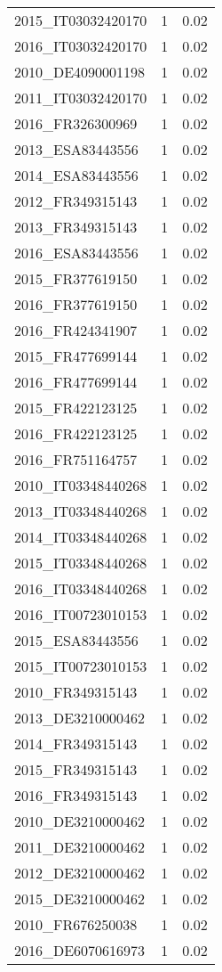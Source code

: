 \begin{table*}[htbp]
\begin{tabular}{lrr}
2015_IT03032420170 & 1 & 0.02 \\
2016_IT03032420170 & 1 & 0.02 \\
2010_DE4090001198 & 1 & 0.02 \\
2011_IT03032420170 & 1 & 0.02 \\
2016_FR326300969 & 1 & 0.02 \\
2013_ESA83443556 & 1 & 0.02 \\
2014_ESA83443556 & 1 & 0.02 \\
2012_FR349315143 & 1 & 0.02 \\
2013_FR349315143 & 1 & 0.02 \\
2016_ESA83443556 & 1 & 0.02 \\
2015_FR377619150 & 1 & 0.02 \\
2016_FR377619150 & 1 & 0.02 \\
2016_FR424341907 & 1 & 0.02 \\
2015_FR477699144 & 1 & 0.02 \\
2016_FR477699144 & 1 & 0.02 \\
2015_FR422123125 & 1 & 0.02 \\
2016_FR422123125 & 1 & 0.02 \\
2016_FR751164757 & 1 & 0.02 \\
2010_IT03348440268 & 1 & 0.02 \\
2013_IT03348440268 & 1 & 0.02 \\
2014_IT03348440268 & 1 & 0.02 \\
2015_IT03348440268 & 1 & 0.02 \\
2016_IT03348440268 & 1 & 0.02 \\
2016_IT00723010153 & 1 & 0.02 \\
2015_ESA83443556 & 1 & 0.02 \\
2015_IT00723010153 & 1 & 0.02 \\
2010_FR349315143 & 1 & 0.02 \\
2013_DE3210000462 & 1 & 0.02 \\
2014_FR349315143 & 1 & 0.02 \\
2015_FR349315143 & 1 & 0.02 \\
2016_FR349315143 & 1 & 0.02 \\
2010_DE3210000462 & 1 & 0.02 \\
2011_DE3210000462 & 1 & 0.02 \\
2012_DE3210000462 & 1 & 0.02 \\
2015_DE3210000462 & 1 & 0.02 \\
2010_FR676250038 & 1 & 0.02 \\
2016_DE6070616973 & 1 & 0.02 \\

\end{tabular}
\end{table*}
